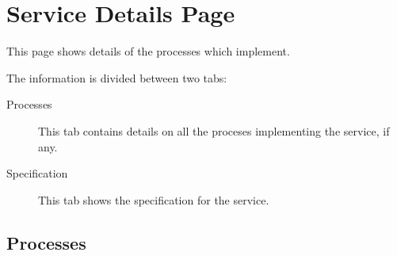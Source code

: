 % 
% 
% 
% 
\section{Service Details Page}
\label{sec:ws-service-details}

This page shows details of the processes which implement. 

The information is divided between two tabs:

   \begin{description}
       \item[Processes] This tab contains details on all the proceses implementing
         the service, if any.
       \item[Specification] This tab shows the specification for the service.  
   \end{description}  

   \subsection{Processes}
   \label{sec:ws-services-processes}

